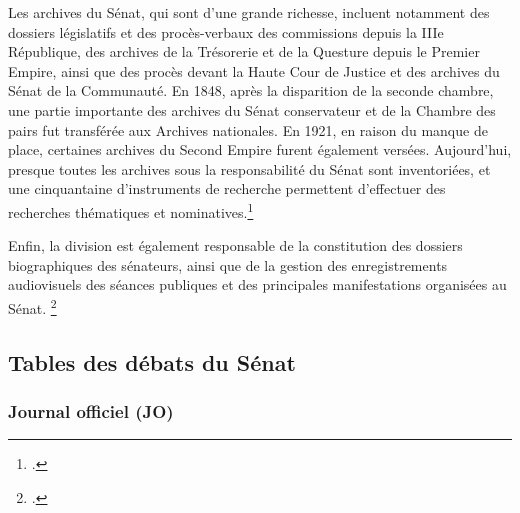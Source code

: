 Les archives du Sénat, qui sont d’une grande richesse, incluent notamment des dossiers législatifs et des procès-verbaux des commissions depuis la IIIe République, des archives de la Trésorerie et de la Questure depuis le Premier Empire, ainsi que des procès devant la Haute Cour de Justice et des archives du Sénat de la Communauté. En 1848, après la disparition de la seconde chambre, une partie importante des archives du Sénat conservateur et de la Chambre des pairs fut transférée aux Archives nationales. En 1921, en raison du manque de place, certaines archives du Second Empire furent également versées. Aujourd'hui, presque toutes les archives sous la responsabilité du Sénat sont inventoriées, et une cinquantaine d'instruments de recherche permettent d’effectuer des recherches thématiques et nominatives.\footcite{GuideduLecteur}

Enfin, la division est également responsable de la constitution des dossiers biographiques des sénateurs, ainsi que de la gestion des enregistrements audiovisuels des séances publiques et des principales manifestations organisées au Sénat. \footcite{GuideduLecteur}


\subsection{Tables des débats du Sénat}

\subsubsection{Journal officiel (JO)}

